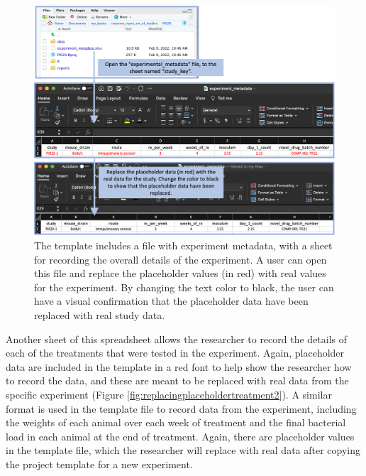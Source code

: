 \documentclass[]{tufte-book}
\begin{document}
\begin{figure}
\includegraphics[width=\textwidth]{figures/project_replace_placeholder_metadata} \caption[The template includes a file with experiment metadata, with a sheet for recording the overall details of the experiment]{The template includes a file with experiment metadata, with a sheet for recording the overall details of the experiment. A user can open this file and replace the placeholder values (in red) with real values for the experiment. By changing the text color to black, the user can have a visual confirmation that the placeholder data have been replaced with real study data.}\label{fig:replacingplaceholdermetadata}
\end{figure}

Another sheet of this spreadsheet allows the researcher to record the details of
each of the treatments that were tested in the experiment. Again, placeholder
data are included in the template in a red font to help show the researcher how
to record the data, and these are meant to be replaced with real data from the
specific experiment (Figure \ref{fig:replacingplaceholdertreatment2}). A
similar format is used in the template file to record data from the experiment,
including the weights of each animal over each week of treatment and the final
bacterial load in each animal at the end of treatment. Again, there are
placeholder values in the template file, which the researcher will replace with
real data after copying the project template for a new experiment.
\end{document}
